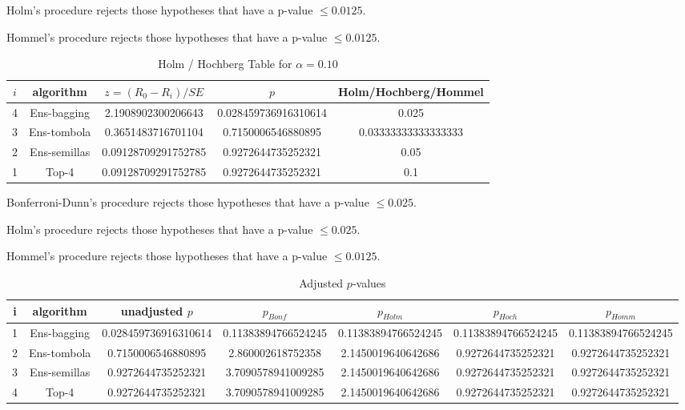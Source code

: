 \documentclass[a4paper,10pt]{article}
\begin{document}
\begin{landscape}
Holm's procedure rejects those hypotheses that have a p-value $\le0.0125$.


Hommel's procedure rejects those hypotheses that have a p-value $\le0.0125$.


\begin{table}[!htp]
\centering\tiny
\caption{Holm / Hochberg Table for $\alpha=0.10$}
\begin{tabular}{ccccc}
$i$&algorithm&$z=(R_0 - R_i)/SE$&$p$&Holm/Hochberg/Hommel\\
\hline
4&Ens-bagging&2.1908902300206643&0.028459736916310614&0.025\\
3&Ens-tombola&0.3651483716701104&0.7150006546880895&0.03333333333333333\\
2&Ens-semillas&0.09128709291752785&0.9272644735252321&0.05\\
1&Top-4&0.09128709291752785&0.9272644735252321&0.1\\
\hline
\end{tabular}
\end{table}
Bonferroni-Dunn's procedure rejects those hypotheses that have a p-value $\le0.025$.


Holm's procedure rejects those hypotheses that have a p-value $\le0.025$.


Hommel's procedure rejects those hypotheses that have a p-value $\le0.0125$.


\begin{table}[!htp]
\centering\tiny
\caption{Adjusted $p$-values}
\begin{tabular}{ccccccc}
i&algorithm&unadjusted $p$&$p_{Bonf}$&$p_{Holm}$&$p_{Hoch}$&$p_{Homm}$\\
\hline
1&Ens-bagging&0.028459736916310614&0.11383894766524245&0.11383894766524245&0.11383894766524245&0.11383894766524245\\
2&Ens-tombola&0.7150006546880895&2.860002618752358&2.1450019640642686&0.9272644735252321&0.9272644735252321\\
3&Ens-semillas&0.9272644735252321&3.7090578941009285&2.1450019640642686&0.9272644735252321&0.9272644735252321\\
4&Top-4&0.9272644735252321&3.7090578941009285&2.1450019640642686&0.9272644735252321&0.9272644735252321\\
\hline
\end{tabular}
\end{table}


\end{landscape}
\end{document}
